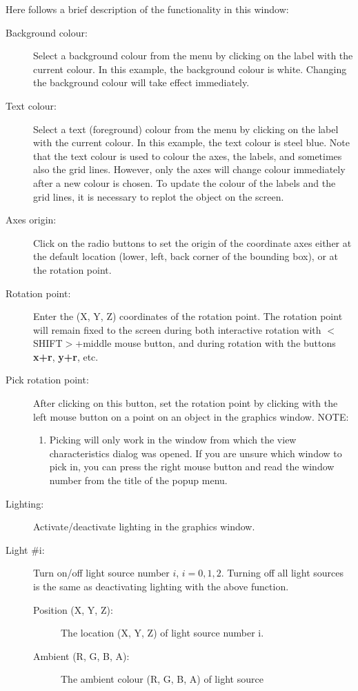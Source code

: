 Here follows a brief description of the functionality in this window:
\begin{description}
\item[Background colour:]Select a background colour from the menu by
clicking on the label with the current colour. In this example, the
background colour is white. Changing the background colour will take
effect immediately.
%
\item[Text colour:]Select a text (foreground) colour from the menu by
clicking on the label with the current colour. In this example, the
text colour is steel blue. Note that the text colour is used to colour
the axes, the labels, and sometimes also the grid lines. However, only
the axes will change colour immediately after a new colour is
chosen. To update the colour of the labels and the grid lines, it is
necessary to replot the object on the screen.
%
\item[Axes origin:] Click on the radio buttons to set the origin of
the coordinate axes either at the default location (lower, left,
back corner of the bounding box), or at the rotation point.
%
\item[Rotation point:] Enter the (X, Y, Z) coordinates of the rotation
point. The rotation point will remain fixed to the screen during both
interactive rotation with $<$SHIFT$>$+middle mouse button, and during
rotation with the buttons {\bf x+r}, {\bf y+r}, etc.
%
\item[Pick rotation point:]After clicking on this button, set the
rotation point by clicking with the left mouse button on a point
on an object in the graphics window. NOTE: 
\begin{enumerate}
\item Picking will only work in the window from which the view
characteristics dialog was opened. If you are unsure which window to
pick in, you can press the right mouse button and read the window
number from the title of the popup menu.
\end{enumerate}
%
\item[Lighting:]Activate/deactivate lighting in the graphics window.
%
\item[Light \#i:]Turn on/off light source number $i$,
$i=0,1,2$. Turning off all light sources is the same as deactivating
lighting with the above function.
%
\begin{description}
\item[Position (X, Y, Z):]The location (X, Y, Z) of light source
number i. 
\item[Ambient (R, G, B, A):]The ambient colour (R, G, B, A) of light source

\end{description}
\end{description}

